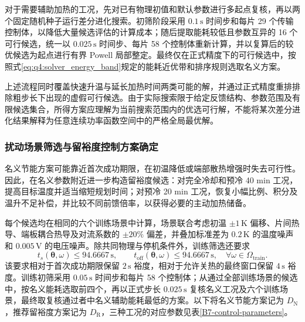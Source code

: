 \documentclass[bwprint]{gmcmthesis}
\numberwithin{figure}{section}
\begin{document}
对于需要辅助加热的工况，先对已有物理初值和默认参数进行多起点复核，再以两个固定随机种子运行差分进化搜索。初筛阶段采用 \(0.1\,\mathrm s\) 时间步和每片 29 个传输控制体，以降低大量候选评估的计算成本；随后提取能耗较低且参数互异的 16 个可行候选，统一以 \(0.025\,\mathrm s\) 时间步、每片 58 个控制体重新计算，并以复算后的较优候选为起点进行有界 Powell 局部整定。最终仅在正式精度下的可行候选中，按照式\eqref{eq:q4:solver_energy_band}规定的能耗近优带和排序规则选取名义方案。

上述流程同时覆盖快速升温与延长加热时间两类可能的解，并通过正式精度重排排除粗步长下出现的虚假可行候选。由于实际搜索限于给定反馈结构、参数范围及有限候选集合，所得方案应理解为当前搜索范围内的优选可行解，不能将某次差分进化结果解释为任意连续功率函数空间中的严格全局最优解。

\subsubsection{扰动场景筛选与留裕度控制方案确定}
名义节能方案可能靠近首次成功期限，在初温降低或端部散热增强时失去可行性。因此，在名义参数附近进一步构造留裕度候选：对完全冷却和预冷 40 min 工况，提高目标温度并适当缩短规划时间；对预冷 20 min 工况，恢复小幅比例、积分及温升不足补偿，并比较不同前馈倍率，以获得必要的主动加热储备。

每个候选均在相同的六个训练场景中计算，场景联合考虑初温 \(\pm1\,\mathrm K\) 偏移、片间热导、端板耦合热导及对流系数的 \(\pm20\%\) 偏差，并叠加标准差为 \(0.2\,\mathrm K\) 的温度噪声和 \(0.005\,\mathrm V\) 的电压噪声。除共同物理与停机条件外，训练筛选还要求
\begin{equation}
t_s(\boldsymbol\theta,\omega)\leq94.6667\,\mathrm s,\qquad
t_{\mathrm{off}}(\boldsymbol\theta,\omega)\leq94.6667\,\mathrm s,
\quad \forall\omega\in\Omega_{\mathrm{train}}.
\tag{7-43}\label{eq:q4:solver_training_deadline}
\end{equation}
该要求相对于首次成功期限保留 \(2\,\mathrm s\) 裕度，相对于允许关热的最终窗口保留 \(4\,\mathrm s\) 裕度。训练初筛采用 \(0.05\,\mathrm s\) 时间步和每片 58 个控制体；从通过全部训练场景的候选中，按名义能耗选取前四个，再以正式步长 \(0.025\,\mathrm s\) 复核名义工况及六个训练场景，最终取复核通过者中名义辅助能耗最低的方案。以下将名义节能方案记为 \(D_{\mathrm N}\)，推荐留裕度方案记为 \(D_{\mathrm R}\)，三种工况的对应参数见表\ref{B7-control-parameters}。
\end{document}
